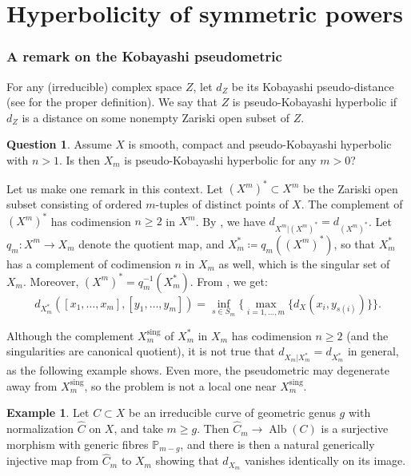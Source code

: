 \documentclass[JEP,XML,SOM,Unicode, NoEqCountersInSection,NoFloatCountersInSection,published]{cedram}
\let\ts\textstyle
\newcommand{\sing}{\mathrm{sing}}
\DeclareMathOperator{\Alb}{Alb}
\theoremstyle{theorem}
\theoremstyle{definition}
\newtheorem{question}{Question}
\newtheorem{example}{Example}
\def\bP{{\mathbb P}}
\begin{document}
\part{Hyperbolicity of symmetric powers}

\section{A remark on the Kobayashi pseudometric}\label{kob}

For any (irreducible) complex space $Z$, let $d_Z$ be its Kobayashi pseudo-distance (see \cite[\S 1.A]{dem12a} for the proper definition). We say that $Z$ is pseudo-Kobayashi hyperbolic if $d_Z$ is a distance on some nonempty Zariski open subset of $Z$.

\begin{question} \label{quest:pseudo} Assume $X$ is smooth, compact and pseudo-Kobayashi hyperbolic with $n>1$. Is then $X_m$ is pseudo-Kobayashi hyperbolic for any $m>0$?
\end{question}

Let us make one remark in this context. Let $(X^m)^*\subset X^m$ be the Zariski open subset consisting of ordered $m$-tuples of distinct points of $X$. The complement of $(X^m)^*$ has codimension $n\geq 2$ in $X^m$. By \cite[Th.\,3.2.22]{Kobayashi}, we have $d_{X^m\vert (X^m)^*}=d_{(X^m)^*}$. Let $q_m:X^m\to X_m$ denote the quotient map, and $X^*_m\coloneqq q_m((X^m)^*)$, so that $X^*_m$ has a complement of codimension $n$ in $X_m$ as well, which is the singular set of $X_m$. Moreover, $(X^m)^*=q_m^{-1}(X^*_m)$.
From \cite[3.1.9 \& 3.2.8]{Kobayashi}, we get:
\[
d_{X^*_m}([x_1,\dots,x_m],[y_1,\dots,y_m])=\inf_{s\in S_m}\{\ts\max_{i=1,\dots,m}\{d_X(x_i,y_{s(i)})\}\}.
\]

Although the complement $X_m^{\sing}$ of $X^*_m$ in $X_m$ has codimension $n\geq 2$ (and the singularities are canonical quotient), it is not true that $d_{X_m\vert X^*_m}=d_{X^*_m}$ in general, as the following example shows. Even more, the pseudometric may degenerate away from $X_m^{\sing}$, so the problem is not a local one near $X_m^{\sing}$.

\begin{example}
Let $C\subset X$ be an irreducible curve of geometric genus $g$ with normalization $\hat{C}$ on $X$, and take $m\geq g$. Then $\hat{C}_m\to \Alb(C)$ is a surjective morphism with generic fibres $\bP_{m-g}$, and there is then a natural generically injective map from $\hat{C}_m$ to $X_m$ showing that $d_{X_m}$ vanishes identically on its image.
\end{example}
\end{document}
